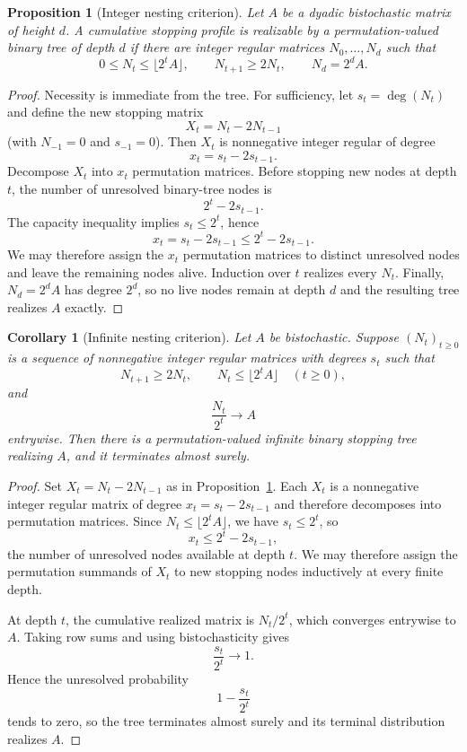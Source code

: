\documentclass[11pt]{article}
\newtheorem{proposition}[theorem]{Proposition}
\newtheorem{corollary}[theorem]{Corollary}
\theoremstyle{definition}
\newcommand{\degm}{\operatorname{deg}}
\begin{document}
\begin{proposition}[Integer nesting criterion]
\label{prop:nesting}
Let $A$ be a dyadic bistochastic matrix of height $d$.
A cumulative stopping profile is realizable by a permutation-valued binary tree of depth $d$ if
there are integer regular matrices $N_0,\ldots,N_d$ such that
\[
0\le N_t\le\lfloor2^tA\rfloor,
\qquad
N_{t+1}\ge2N_t,
\qquad
N_d=2^dA.
\]
\end{proposition}

\begin{proof}
Necessity is immediate from the tree.
For sufficiency, let $s_t=\degm(N_t)$ and define the new stopping matrix
\[
X_t=N_t-2N_{t-1}
\]
(with $N_{-1}=0$ and $s_{-1}=0$).
Then $X_t$ is nonnegative integer regular of degree
\[
x_t=s_t-2s_{t-1}.
\]
Decompose $X_t$ into $x_t$ permutation matrices.
Before stopping new nodes at depth $t$, the number of unresolved binary-tree nodes is
\[
2^t-2s_{t-1}.
\]
The capacity inequality implies $s_t\le2^t$, hence
\[
x_t=s_t-2s_{t-1}\le2^t-2s_{t-1}.
\]
We may therefore assign the $x_t$ permutation matrices to distinct unresolved nodes and leave the
remaining nodes alive.  Induction over $t$ realizes every $N_t$.
Finally, $N_d=2^dA$ has degree $2^d$, so no live nodes remain at depth $d$ and the resulting tree
realizes $A$ exactly.
\end{proof}

\begin{corollary}[Infinite nesting criterion]
\label{cor:infinite-nesting}
Let $A$ be bistochastic.  Suppose $(N_t)_{t\ge0}$ is a sequence of nonnegative integer regular
matrices with degrees $s_t$ such that
\[
N_{t+1}\ge2N_t,
\qquad
N_t\le\lfloor2^tA\rfloor
\quad(t\ge0),
\]
and
\[
\frac{N_t}{2^t}\longrightarrow A
\]
entrywise.  Then there is a permutation-valued infinite binary stopping tree realizing $A$, and
it terminates almost surely.
\end{corollary}

\begin{proof}
Set $X_t=N_t-2N_{t-1}$ as in Proposition~\ref{prop:nesting}.  Each $X_t$ is a nonnegative integer
regular matrix of degree $x_t=s_t-2s_{t-1}$ and therefore decomposes into permutation matrices.
Since $N_t\le\lfloor2^tA\rfloor$, we have $s_t\le2^t$, so
\[
x_t\le2^t-2s_{t-1},
\]
the number of unresolved nodes available at depth $t$.  We may therefore assign the permutation
summands of $X_t$ to new stopping nodes inductively at every finite depth.

At depth $t$, the cumulative realized matrix is $N_t/2^t$, which converges entrywise to $A$.
Taking row sums and using bistochasticity gives
\[
\frac{s_t}{2^t}\longrightarrow1.
\]
Hence the unresolved probability
\[
1-\frac{s_t}{2^t}
\]
tends to zero, so the tree terminates almost surely and its terminal distribution realizes $A$.
\end{proof}
\end{document}
